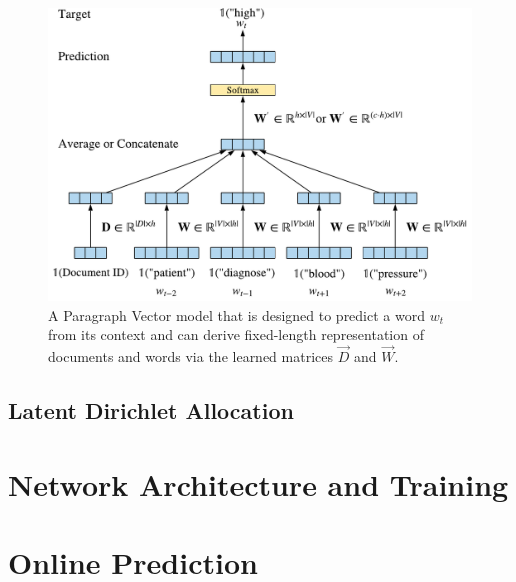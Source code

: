 \begin{figure}[!htbp]
	\centering
	\includegraphics[width=\textwidth]{figures/paragraph-vector}
	\caption{A Paragraph Vector model that is designed to predict a word $w_t$ from its context and can derive fixed-length representation of documents and words via the learned matrices $\vec{D}$ and $\vec{W}$.}
	\label{fig:paragraph-vector}
\end{figure}





\subsection{Latent Dirichlet Allocation}

\section{Network Architecture and Training}

\section{Online Prediction}